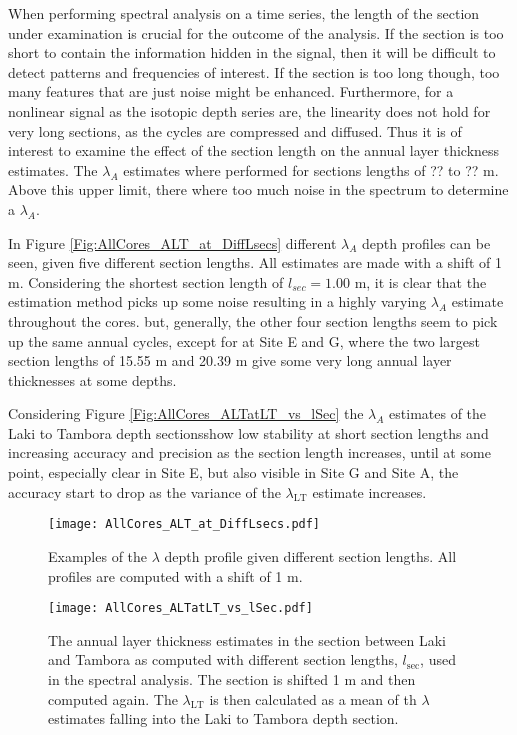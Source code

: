 \documentclass[../../CompleteThesis2/Complete_2ndDraft]{subfiles}
\begin{document}
When performing spectral analysis on a time series, the length of the section under examination is crucial for the outcome of the analysis. If the section is too short to contain the information hidden in the signal, then it will be difficult to detect patterns and frequencies of interest. If the section is too long though, too many features that are just noise might be enhanced. Furthermore, for a nonlinear signal as the isotopic depth series are, the linearity does not hold for very long sections, as the cycles are compressed and diffused. Thus it is of interest to examine the effect of the section length on the annual layer thickness estimates. The $\lambda_A$ estimates where performed for sections lengths of ?? to ?? m. Above this upper limit, there where too much noise in the spectrum to determine a $\lambda_A$.

In Figure \ref{Fig:AllCores_ALT_at_DiffLsecs} different $\lambda_A$ depth profiles can be seen, given five different section lengths. All estimates are made with a shift of 1 m. Considering the shortest section length of $l_{sec}=1.00$ m, it is clear that the estimation method picks up some noise resulting in a highly varying $\lambda_A$ estimate throughout the cores. but, generally, the other four section lengths seem to pick up the same annual cycles, except for at Site E and G, where the two largest section lengths of 15.55 m and 20.39 m give some very long annual layer thicknesses at some depths.

Considering Figure \ref{Fig:AllCores_ALTatLT_vs_lSec} the $\lambda_A$ estimates  of the Laki to Tambora depth sectionsshow low stability at short section lengths and increasing accuracy and precision as the section length increases, until at some point, especially clear in Site E, but also visible in Site G and Site A, the accuracy start to drop as the variance of the $\lambda_{\text{LT}}$ estimate increases.
\begin{figure}[h]
	\centering
	\texttt{[image: AllCores\_ALT\_at\_DiffLsecs.pdf]}
	\caption[$\lambda$ Depth Profiles, Different $l_{\text{sec}}$]{\small Examples of the $\lambda$ depth profile given different section lengths. All profiles are computed with a shift of 1 m.}
	\label{fig:AllCores_ALT_at_DiffLsecs}
\end{figure}

\begin{figure}[h]
	\centering
	\texttt{[image: AllCores\_ALTatLT\_vs\_lSec.pdf]}
	\caption[$\lambda_{\text{LT}}$ vs. Section Length]{\small The annual layer thickness estimates in the section between Laki and Tambora as computed with different section lengths, $l_{\text{sec}}$, used in the spectral analysis. The section is shifted 1 m and then computed again. The $\lambda_{\text{LT}}$ is then calculated as a mean of th $\lambda$ estimates falling into the Laki to Tambora depth section.}
	\label{fig:AllCores_ALTatLT_vs_lSec}
\end{figure}
\end{document}
